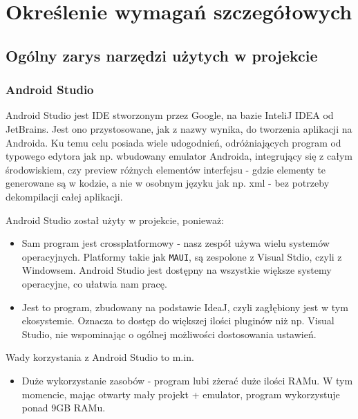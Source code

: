 \newpage
\section{Określenie wymagań szczegółowych}		%

\subsection{Ogólny zarys narzędzi użytych w projekcie}

\subsubsection{Android Studio}

Android Studio jest IDE stworzonym przez Google, na bazie InteliJ IDEA od JetBrains. Jest ono przystosowane, jak z nazwy wynika, do tworzenia aplikacji na Androida. Ku temu celu posiada wiele udogodnień, odróżniających program od typowego edytora jak np. wbudowany emulator Androida, integrujący się z całym środowiskiem, czy preview różnych elementów interfejsu - gdzie elementy te generowane są w kodzie, a nie w osobnym języku jak np. xml - bez potrzeby dekompilacji całej aplikacji. 

Android Studio został użyty w projekcie, ponieważ:

\begin{itemize}
	\item Sam program jest crossplatformowy - nasz zespół używa wielu systemów operacyjnych. Platformy takie jak \texttt{MAUI}, są zespolone z Visual Stdio, czyli z Windowsem. Android Studio jest dostępny na wszystkie większe systemy operacyjne, co ułatwia nam pracę.
	\item Jest to program, zbudowany na podstawie IdeaJ, czyli zagłębiony jest w tym ekosystemie. Oznacza to dostęp do większej ilości pluginów niż np. Visual Studio, nie wspominając o ogólnej możliwości dostosowania ustawień.
\end{itemize}

Wady korzystania z Android Studio to m.in.

\begin{itemize}
	\item Duże wykorzystanie zasobów - program lubi zżerać duże ilości RAMu. W tym momencie, mając otwarty mały projekt + emulator, program wykorzystuje ponad 9GB RAMu. 
\end{itemize}


